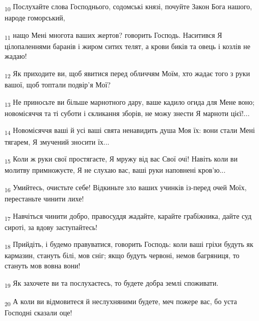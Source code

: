 \begin{tcolorbox}
\textsubscript{10} Послухайте слова Господнього, содомські князі, почуйте Закон Бога нашого, народе гоморський,
\end{tcolorbox}
\begin{tcolorbox}
\textsubscript{11} нащо Мені многота ваших жертов? говорить Господь. Наситився Я цілопаленнями баранів і жиром ситих телят, а крови биків та овець і козлів не жадаю!
\end{tcolorbox}
\begin{tcolorbox}
\textsubscript{12} Як приходите ви, щоб явитися перед обличчям Моїм, хто жадає того з руки вашої, щоб топтали подвір'я Мої?
\end{tcolorbox}
\begin{tcolorbox}
\textsubscript{13} Не приносьте ви більше марнотного дару, ваше кадило огида для Мене воно; новомісяччя та ті суботи і скликання зборів, не можу знести Я марноти цієї!...
\end{tcolorbox}
\begin{tcolorbox}
\textsubscript{14} Новомісяччя ваші й усі ваші свята ненавидить душа Моя їх: вони стали Мені тягарем, Я змучений зносити їх...
\end{tcolorbox}
\begin{tcolorbox}
\textsubscript{15} Коли ж руки свої простягаєте, Я мружу від вас Свої очі! Навіть коли ви молитву примножуєте, Я не слухаю вас, ваші руки наповнені кров'ю...
\end{tcolorbox}
\begin{tcolorbox}
\textsubscript{16} Умийтесь, очистьте себе! Відкиньте зло ваших учинків із-перед очей Моїх, перестаньте чинити лихе!
\end{tcolorbox}
\begin{tcolorbox}
\textsubscript{17} Навчіться чинити добро, правосуддя жадайте, карайте грабіжника, дайте суд сироті, за вдову заступайтесь!
\end{tcolorbox}
\begin{tcolorbox}
\textsubscript{18} Прийдіть, і будемо правуватися, говорить Господь: коли ваші гріхи будуть як кармазин, стануть білі, мов сніг; якщо будуть червоні, немов багряниця, то стануть мов вовна вони!
\end{tcolorbox}
\begin{tcolorbox}
\textsubscript{19} Як захочете ви та послухаєтесь, то будете добра землі споживати.
\end{tcolorbox}
\begin{tcolorbox}
\textsubscript{20} А коли ви відмовитеся й неслухняними будете, меч пожере вас, бо уста Господні сказали оце!
\end{tcolorbox}
